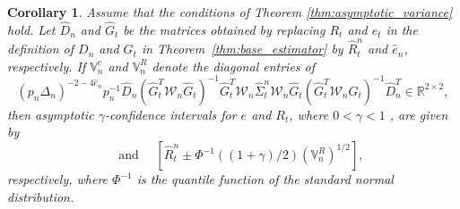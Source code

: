 \documentclass[ecta,nameyear,draft]{econsocart}
\newtheorem{cor}[theorem]{Corollary}
\def\wh{\widehat}
\newcommand{\1}{\mathbf 1}
\newcommand{\qandq} {\quad \text{ and } \quad}
\def\bfu{{\mathbf u}}
\newcommand{\calW}{\mathcal{W}}
\numberwithin{equation}{section}
\newcommand{\R}{\mathbb{R}}
\newcommand{\Den}{\Delta_n}
\begin{document}

\begin{cor}
Assume that the conditions of Theorem \ref{thm:asymptotic_variance} hold. Let $\wh D_n$ and $\wh G_t$ be the matrices obtained by replacing $R_t$ and $e_t$ in the definition of $D_n$ and $G_t$ in Theorem~\ref{thm:base_estimator}   by $\wh R^n_t$ and $\wh e_n$, respectively.  If $\mathbb{V}^e_n$ and $\mathbb{V}^R_n$ denote the diagonal entries of
\begin{equation}
\label{eq:asymptotic_matrix_estimate}
(p_n\Den)^{-2-4\wh e_n}p_n^{-1}
\wh D_n 
(\wh G_t^T \calW_n \wh G_t)^{-1} 
\wh G_t^T 
\calW_n 
\wh \Sigma^n_t
\calW_n
\wh G_t
(\wh G_t^T \calW_n \wh G_t)^{-1} 
\wh D_n^{T} \in\R^{2\times 2}, 
\end{equation}
then asymptotic $\gamma$-confidence intervals  for $e$ and $R_t$, where $0 < \gamma < 1$ , are given by
\begin{equation*}
[\wh e_n \pm \Phi^{-1}((1+\gamma)/2) (\mathbb{V}^e_n)^{1/2}]
\qandq
[\wh R^n_t \pm \Phi^{-1}((1+\gamma)/2) (\mathbb{V}^R_n)^{1/2}],
\end{equation*}
respectively, where $\Phi^{-1}$ is the quantile function of the standard normal distribution.
\end{cor}
\end{document}
